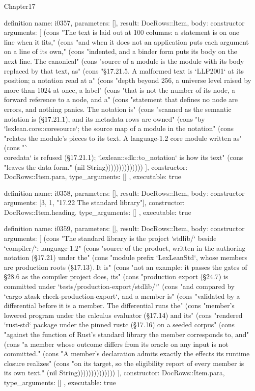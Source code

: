 \begin{lexlean}{Chapter17}
\begin{semanticmodule}
definition{
  name: i0357,
  parameters: [],
  result: DocRows::Item,
  body: constructor{
    arguments: [
      (cons "The text is laid out at 100 columns: a statement is on one line when it fits," (cons "and when it does not an application puts each argument on a line of its own," (cons "indented, and a binder form puts its body on the next line. The canonical" (cons "source of a module is the module with its body replaced by that text, as" (cons "§17.21.5. A malformed text is `LLP2001` at its position; a notation read at a" (cons "depth beyond 256, a universe level raised by more than 1024 at once, a label" (cons "that is not the number of its node, a forward reference to a node, and a" (cons "statement that defines no node are errors, and nothing panics. The notation is" (cons "scanned as the semantic notation is (§17.21.1), and its metadata rows are owned" (cons "by `lexlean.core::coresource`; the source map of a module in the notation" (cons "relates the module's pieces to its text. A language-1.2 core module written as" (cons "`\\coredata` is refused (§17.21.1); `lexlean::sdk::to_notation` is how its text" (cons "leaves the data form." (nil String))))))))))))))
    ],
    constructor: DocRows::Item.para,
    type_arguments: []
  },
  executable: true
}

definition{
  name: i0358,
  parameters: [],
  result: DocRows::Item,
  body: constructor{
    arguments: [3, 1, "17.22 The standard library"],
    constructor: DocRows::Item.heading,
    type_arguments: []
  },
  executable: true
}

definition{
  name: i0359,
  parameters: [],
  result: DocRows::Item,
  body: constructor{
    arguments: [
      (cons "The standard library is the project `stdlib/` beside `compiler/`: language-1.2" (cons "source of the product, written in the authoring notation (§17.21) under the" (cons "module prefix `LexLeanStd`, whose members are production roots (§17.13). It is" (cons "not an example: it passes the gates of §28.6 as the compiler project does, its" (cons "production export (§24.7) is committed under `tests/production-export/stdlib/`" (cons "and compared by `cargo xtask check-production-export`, and a member is" (cons "validated by a differential before it is a member. The differential runs the" (cons "member's lowered program under the calculus evaluator (§17.14) and its" (cons "rendered `rust-std` package under the pinned rustc (§17.16) on a seeded corpus" (cons "against the function of Rust's standard library the member corresponds to, and" (cons "a member whose outcome differs from its oracle on any input is not committed." (cons "A member's declaration admits exactly the effects its runtime closure realizes" (cons "on its target, so the eligibility report of every member is its own text." (nil String))))))))))))))
    ],
    constructor: DocRows::Item.para,
    type_arguments: []
  },
  executable: true
}


\end{semanticmodule}
\end{lexlean}
